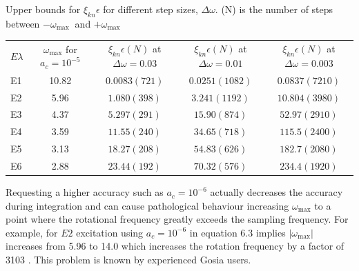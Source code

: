 \documentclass[10pt]{article}
\begin{document}
Upper bounds for $\xi_{k n} \epsilon$ for different step sizes, $\Delta \omega$. (N) is the number of steps between $-\omega_{\text {max }}$ and $+\omega_{\text {max }}$

\begin{center}
\begin{tabular}{lcccc}
$E \lambda$ & $\omega_{\max }$ for $a_{c}=10^{-5}$ & $\xi_{k n} \epsilon(N)$ at $\Delta \omega=0.03$ & $\xi_{k n} \epsilon(N)$ at $\Delta \omega=0.01$ & $\xi_{k n} \epsilon(N)$ at $\Delta \omega=0.003$ \\
E1 & 10.82 & $0.0083(721)$ & $0.0251(1082)$ & $0.0837(7210)$ \\
E2 & 5.96 & $1.080(398)$ & $3.241(1192)$ & $10.804(3980)$ \\
E3 & 4.37 & $5.297(291)$ & $15.90(874)$ & $52.97(2910)$ \\
E4 & 3.59 & $11.55(240)$ & $34.65(718)$ & $115.5(2400)$ \\
E5 & 3.13 & $18.27(208)$ & $54.83(626)$ & $182.7(2080)$ \\
E6 & 2.88 & $23.44(192)$ & $70.32(576)$ & $234.4(1920)$ \\
\end{tabular}
\end{center}

Requesting a higher accuracy such as $a_{c}=10^{-6}$ actually decreases the accuracy during integration and can cause pathological behaviour increasing $\omega_{\max }$ to a point where the rotational frequency greatly exceeds the sampling frequency. For example, for $E 2$ excitation using $a_{c}=10^{-6}$ in equation 6.3 implies $\left|\omega_{\max }\right|$ increases from 5.96 to 14.0 which increases the rotation frequency by a factor of 3103 . This problem is known by experienced Gosia users.
\end{document}
